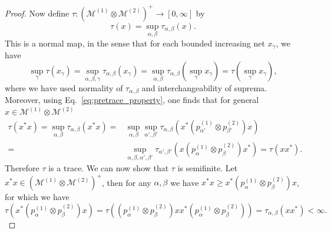 \documentclass[sn-mathphys-num]{sn-jnl}%
\newcommand{\MM}{\mathcal{M}}
\numberwithin{equation}{section}
\theoremstyle{thmstyleone}%
\theoremstyle{thmstyletwo}%
\theoremstyle{thmstylethree}%
\begin{document}
\begin{proof}
   Now define $\tau: (\MM^{(1)}\otimes \MM^{(2)})^+\to [0,\infty]$ by
    \begin{equation}
        \tau(x)=\sup_{\alpha,\beta}\tau_{\alpha,\beta}(x).
    \end{equation}
    This is a normal map, in the sense that for each bounded increasing net $x_\gamma$, we have
    \begin{equation}
        \sup_{\gamma}\tau(x_\gamma)=\sup_{\alpha,\beta,\gamma}\tau_{\alpha,\beta}(x_\gamma)=\sup_{\alpha,\beta}\tau_{\alpha,\beta}(\sup_\gamma x_\gamma)=\tau(\sup_\gamma x_\gamma),
    \end{equation}
    where we have used normality of $\tau_{\alpha,\beta}$ and interchangeability of suprema.
    Moreover, using Eq.~\eqref{eq:pretrace_property}, one finds that for general $x\in \MM^{(1)}\otimes\MM^{(2)}$
    \begin{align}
        \tau(x^*x)=\sup_{\alpha,\beta}\tau_{\alpha,\beta}(x^*x)=&\sup_{\alpha,\beta}\sup_{\alpha',\beta'}\tau_{\alpha,\beta}(x^*(p_{\alpha'}^{(1)}\otimes p_{\beta'}^{(2)})x)\nonumber\\
        =&\sup_{\alpha,\beta,\alpha',\beta'}\tau_{\alpha',\beta'}(x(p_\alpha^{(1)}\otimes p_\beta^{(2)})x^*)=\tau(xx^*).
    \end{align}
    Therefore $\tau$ is a trace. We can now show that $\tau$ is semifinite. Let $x^*x\in(\MM^{(1)}\otimes \MM^{(2)})^+$, then for any $\alpha,\beta$ we have $x^*x\geq x^*(p_\alpha^{(1)}\otimes p_\beta^{(2)})x$, for which we have
    \begin{equation}
        \tau(x^*(p_\alpha^{(1)}\otimes p_\beta^{(2)})x)=\tau((p_\alpha^{(1)}\otimes p_\beta^{(2)})xx^*(p_\alpha^{(1)}\otimes p_\beta^{(2)}))=\tau_{\alpha,\beta}(xx^*)<\infty.
    \end{equation}


\end{proof}
\end{document}
